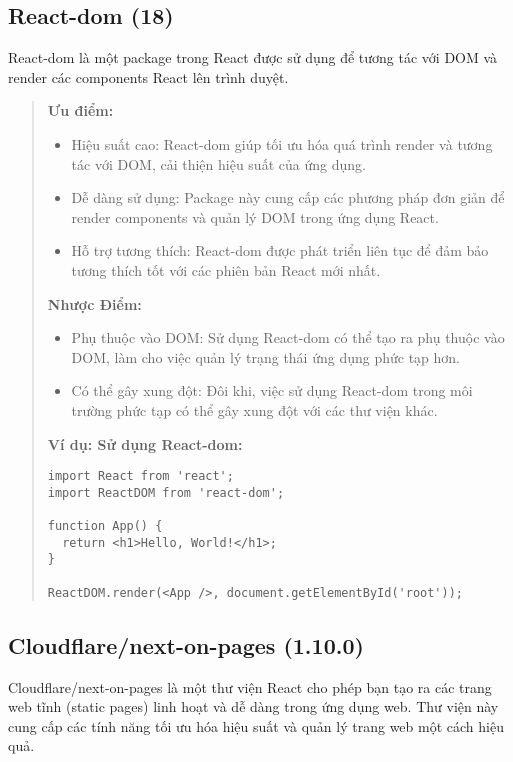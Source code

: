 \subsection{React-dom (18)}

React-dom là một package trong React được sử dụng để tương tác với DOM và render các components React lên trình duyệt.

\begin{quote}
\textbf{Ưu điểm:}
\begin{itemize}
  \item Hiệu suất cao: React-dom giúp tối ưu hóa quá trình render và tương tác với DOM, cải thiện hiệu suất của ứng dụng.
  \item Dễ dàng sử dụng: Package này cung cấp các phương pháp đơn giản để render components và quản lý DOM trong ứng dụng React.
  \item Hỗ trợ tương thích: React-dom được phát triển liên tục để đảm bảo tương thích tốt với các phiên bản React mới nhất.
\end{itemize}

\textbf{Nhược Điểm:}
\begin{itemize}
  \item Phụ thuộc vào DOM: Sử dụng React-dom có thể tạo ra phụ thuộc vào DOM, làm cho việc quản lý trạng thái ứng dụng phức tạp hơn.
  \item Có thể gây xung đột: Đôi khi, việc sử dụng React-dom trong môi trường phức tạp có thể gây xung đột với các thư viện khác.
\end{itemize}

\textbf{Ví dụ: Sử dụng React-dom:}
\begin{lstlisting}
import React from 'react';
import ReactDOM from 'react-dom';

function App() {
  return <h1>Hello, World!</h1>;
}

ReactDOM.render(<App />, document.getElementById('root'));
\end{lstlisting}
\end{quote}



\subsection{Cloudflare/next-on-pages (1.10.0)}

Cloudflare/next-on-pages là một thư viện React cho phép bạn tạo ra các trang web tĩnh (static pages) linh hoạt và dễ dàng trong ứng dụng web. Thư viện này cung cấp các tính năng tối ưu hóa hiệu suất và quản lý trang web một cách hiệu quả.

